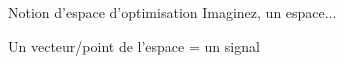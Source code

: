 \documentclass[9pt, aspectratio=169]{beamer}
\begin{document}
\begin{frame}{Notion d'espace d'optimisation} %
Imaginez, un espace...
\begin{figure}
\end{figure}

Un vecteur/point de l'espace = un signal

\end{frame}
\end{document}
